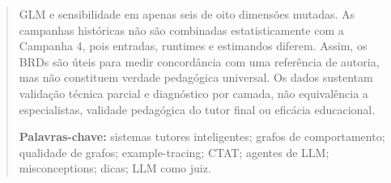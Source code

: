 \documentclass[11pt,a4paper]{article}
\begin{document}
\begin{abstract}
GLM e sensibilidade em apenas seis de oito dimensões mutadas. As campanhas históricas não são combinadas estatisticamente com a Campanha 4, pois entradas, runtimes e estimandos diferem. Assim, os BRDs são úteis para medir concordância com uma referência de autoria, mas não constituem verdade pedagógica universal. Os dados sustentam validação técnica parcial e diagnóstico por camada, não equivalência a especialistas, validade pedagógica do tutor final ou eficácia educacional.

\smallskip\noindent\textbf{Palavras-chave:} sistemas tutores inteligentes; grafos de comportamento; qualidade de grafos; example-tracing; CTAT; agentes de LLM; misconceptions; dicas; LLM como juiz.
\end{abstract}

\begin{otherlanguage}{english}
\renewcommand{\abstractname}{Abstract}
\begin{abstract}

\end{abstract}
\end{otherlanguage}
\end{document}

